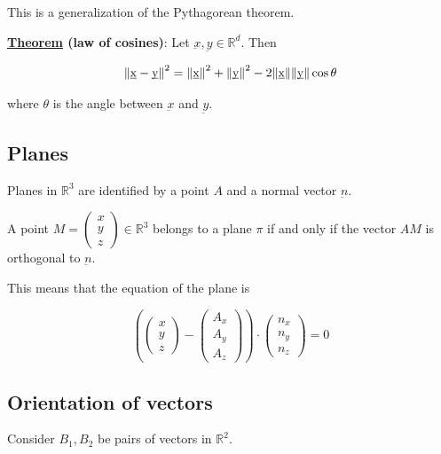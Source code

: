 \documentclass[10pt]{extarticle}
\newcommand{\R}{\mathbb{R}}
\begin{document}
This is a generalization of the Pythagorean theorem.

\textbf{\underline{Theorem} (law of cosines)}: Let $\underbar{x}, \underbar{y} \in \R^d$. Then

$$
    \norm{\underbar{x} - \underbar{y}}^2 = \norm{\underbar{x}}^2 + \norm{\underbar{y}}^2 - 2 \norm{\underbar{x}} \norm{\underbar{y}} \cos \theta
$$

where $\theta$ is the angle between $\underbar{x}$ and $\underbar{y}$.

\subsection{Planes}

Planes in $\R^3$ are identified by a point $A$ and a normal vector $\underbar{n}$.

A point $M = \begin{pmatrix}
        x \\ y \\ z
    \end{pmatrix} \in \R^3$ belongs to a plane $\pi$ if and only if the vector $AM$ is orthogonal to $\underbar{n}$.

This means that the equation of the plane is

$$
    \left(
    \begin{pmatrix}
            x \\ y \\ z
        \end{pmatrix} - \begin{pmatrix}
            A_x \\ A_y \\ A_z
        \end{pmatrix}
    \right)
    \cdot
    \begin{pmatrix}
        n_x \\ n_y \\ n_z
    \end{pmatrix}
    = 0
$$

\subsection{Orientation of vectors}

Consider $B_1, B_2$ be pairs of vectors in $\R^2$.

\begin{center}

    \label{fig:orientation_of_vectors}
\end{center}
\end{document}
